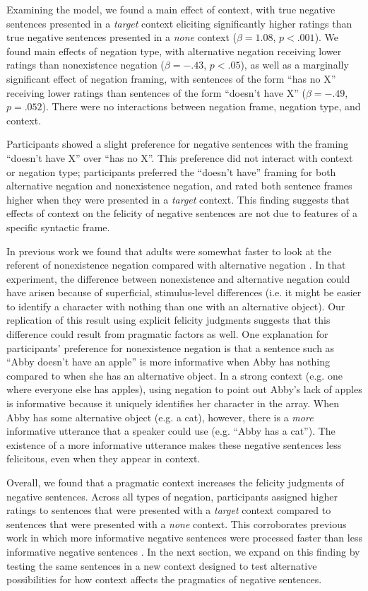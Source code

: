 \documentclass[man, noapacite]{apa2}
\begin{document}
Examining the model, we found a main effect of context, with true negative sentences presented in a \emph{target} context eliciting significantly higher ratings than true negative sentences presented in a \emph{none} context ($\beta= 1.08$, $p< .001$).  We found main effects of negation type, with alternative negation receiving lower ratings than nonexistence negation ($\beta= -.43$, $p< .05$), as well as a marginally significant effect of negation framing, with sentences of the form ``has no X'' receiving lower ratings than sentences of the form ``doesn't have X''  ($\beta= -.49$, $p= .052$).  There were no interactions between negation frame, negation type, and context.  

Participants showed a slight preference for negative sentences with the framing ``doesn't have X'' over ``has no X''.  This preference did not interact with context or negation type; participants preferred the ``doesn't have'' framing for both alternative negation and nonexistence negation, and rated both sentence frames higher when they were presented in a \emph{target} context.  This finding suggests that effects of context on the felicity of negative sentences are not due to features of a specific syntactic frame.

In previous work we found that adults were somewhat faster to look at the referent of nonexistence negation compared with alternative negation \cite{nordmeyer2014b}. In that experiment, the difference between nonexistence and alternative negation could have arisen because of superficial, stimulus-level differences (i.e. it might be easier to identify a character with nothing than one with an alternative object). Our replication of this result using explicit felicity judgments suggests that this difference could result from pragmatic factors as well. One explanation for participants' preference for nonexistence negation is that a sentence such as ``Abby doesn't have an apple'' is more informative when Abby has nothing compared to when she has an alternative object.  In a strong context (e.g. one where everyone else has apples), using negation to point out Abby's lack of apples is informative because it uniquely identifies her character in the array.  When Abby has some alternative object (e.g. a cat), however, there is a \emph{more} informative utterance that a speaker could use (e.g. ``Abby has a cat'').  The existence of a more informative utterance makes these negative sentences less felicitous, even when they appear in context.

Overall, we found that a pragmatic context increases the felicity judgments of negative sentences.  Across all types of negation, participants assigned higher ratings to sentences that were presented with a \emph{target} context compared to sentences that were presented with a \emph{none} context.  This corroborates previous work in which more informative negative sentences were processed faster than less informative negative sentences \cite{nordmeyer2014}.  In the next section, we expand on this finding by testing the same sentences in a new context designed to test alternative possibilities for how context affects the pragmatics of negative sentences.
\end{document}

